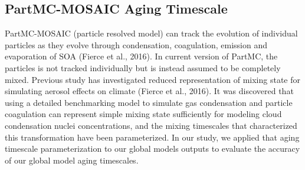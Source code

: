 \documentclass[12pt]{article}
\begin{document}
		 \subsection{PartMC-MOSAIC Aging Timescale}
		 PartMC-MOSAIC (particle resolved model) can track the evolution of individual particles as they evolve through condensation, coagulation, emission and evaporation of SOA (Fierce et al., 2016). In current version of PartMC, the particles is not tracked individually but is instead assumed to be completely mixed. Previous study has investigated reduced representation of mixing state for simulating aerosol effects on climate (Fierce et al., 2016). It was discovered that using a detailed benchmarking model to simulate gas condensation and particle coagulation can represent simple mixing state sufficiently for modeling cloud condensation nuclei concentrations, and the mixing timescales that characterized this transformation have been parameterized. In our study, we applied that aging timescale parameterization to our global models outputs to evaluate the accuracy of our global model aging timescales.
		 
\end{document}
